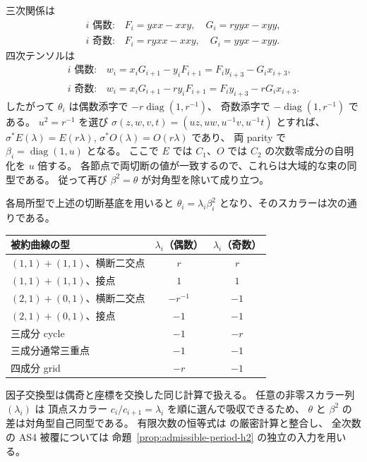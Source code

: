 三次関係は
\[
 \begin{array}{ll}
 i\text{ 偶数}:&F_i=yxx-xxy,\quad G_i=ryyx-xyy,\\
 i\text{ 奇数}:&F_i=ryxx-xxy,\quad G_i=yyx-xyy.
 \end{array}
\]
四次テンソルは
\[
 \begin{array}{ll}
 i\text{ 偶数}:&w_i=x_iG_{i+1}-y_iF_{i+1}
                     =F_i y_{i+3}-G_i x_{i+3},\\
 i\text{ 奇数}:&w_i=x_iG_{i+1}-r y_iF_{i+1}
                     =F_i y_{i+3}-rG_i x_{i+3}.
 \end{array}
\]
したがって $\theta_i$ は偶数添字で $-r\operatorname{diag}(1,r^{-1})$、
奇数添字で $-\operatorname{diag}(1,r^{-1})$ である。
$u^2=r^{-1}$ を選び
$\sigma(z,w,v,t)=(uz,uw,u^{-1}v,u^{-1}t)$ とすれば、
$\sigma^*E(\lambda)=E(r\lambda)$, $\sigma^*O(\lambda)=O(r\lambda)$ であり、
両 parity で $\beta_i=\operatorname{diag}(1,u)$ となる。
ここで $E$ では $C_1$、$O$ では $C_2$ の次数零成分の自明化を $u$ 倍する。
各節点で両切断の値が一致するので、これらは大域的な束の同型である。
従って再び $\beta^2=\theta$ が対角型を除いて成り立つ。

\begin{remark}[被約境界の二周期と四周期の比較表]
各局所型で上述の切断基底を用いると
$\theta_i=\lambda_i\beta_i^2$ となり、そのスカラーは次の通りである。
\begin{center}
\begin{tabular}{lcc}
\toprule
被約曲線の型 & $\lambda_i$（偶数） & $\lambda_i$（奇数）\\
\midrule
$(1,1)+(1,1)$、横断二交点 & $r$ & $r$\\
$(1,1)+(1,1)$、接点 & $1$ & $1$\\
$(2,1)+(0,1)$、横断二交点 & $-r^{-1}$ & $-1$\\
$(2,1)+(0,1)$、接点 & $-1$ & $-1$\\
三成分 cycle & $-1$ & $-r$\\
三成分通常三重点 & $-1$ & $-1$\\
四成分 grid & $-r$ & $-1$\\
\bottomrule
\end{tabular}
\end{center}
因子交換型は偶奇と座標を交換した同じ計算で扱える。
任意の非零スカラー列 $(\lambda_i)$ は
頂点スカラー $c_i/c_{i+1}=\lambda_i$ を順に選んで吸収できるため、
$\theta$ と $\beta^2$ の差は対角型自己同型である。
有限次数の恒等式は
 の厳密計算と整合し、
全次数の AS4 被覆については
命題~\ref{prop:admissible-period-h2} の独立の入力を用いる。
\end{remark}

